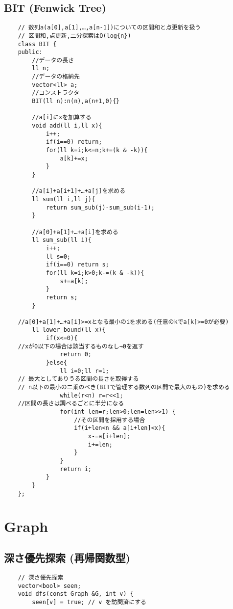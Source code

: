 \documentclass[a4paper, landscape, 9pt]{jarticle} %
\begin{document}
\begin{multicols*}{3}
    \subsection{BIT  (Fenwick Tree)}
    \begin{lstlisting}
    // 数列a(a[0],a[1],…,a[n-1])についての区間和と点更新を扱う
    // 区間和,点更新,二分探索はO(log{n})
    class BIT {
    public:
        //データの長さ
        ll n;
        //データの格納先
        vector<ll> a;
        //コンストラクタ
        BIT(ll n):n(n),a(n+1,0){}
    
        //a[i]にxを加算する
        void add(ll i,ll x){
            i++;
            if(i==0) return;
            for(ll k=i;k<=n;k+=(k & -k)){
                a[k]+=x;
            }
        }
    
        //a[i]+a[i+1]+…+a[j]を求める
        ll sum(ll i,ll j){
            return sum_sub(j)-sum_sub(i-1);
        }
    
        //a[0]+a[1]+…+a[i]を求める
        ll sum_sub(ll i){
            i++;
            ll s=0;
            if(i==0) return s;
            for(ll k=i;k>0;k-=(k & -k)){
                s+=a[k];
            }
            return s;
        }
    
    //a[0]+a[1]+…+a[i]>=xとなる最小のiを求める(任意のkでa[k]>=0が必要)
        ll lower_bound(ll x){
            if(x<=0){
    //xが0以下の場合は該当するものなし→0を返す
                return 0;
            }else{
                ll i=0;ll r=1;
    // 最大としてありうる区間の長さを取得する
    // n以下の最小の二乗のべき(BITで管理する数列の区間で最大のもの)を求める
                while(r<n) r=r<<1;
    //区間の長さは調べるごとに半分になる
                for(int len=r;len>0;len=len>>1) {
                    //その区間を採用する場合
                    if(i+len<n && a[i+len]<x){
                        x-=a[i+len];
                        i+=len;
                    }
                }
                return i;
            }
        }
    };
    \end{lstlisting}
    \section{Graph}

    \subsection{深さ優先探索 (再帰関数型)}
    \begin{lstlisting}
    // 深さ優先探索
    vector<bool> seen;
    void dfs(const Graph &G, int v) {
        seen[v] = true; // v を訪問済にする
    

\end{lstlisting}
\end{multicols*}
\end{document}

